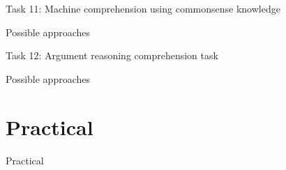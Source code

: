 \documentclass[10pt, compress]{beamer}
\begin{document}
\begin{frame}{Task 11: Machine comprehension using commonsense knowledge}


\end{frame}

\begin{frame}{Possible approaches}


\end{frame}

\begin{frame}{Task 12: Argument reasoning comprehension task}


\end{frame}

\begin{frame}{Possible approaches}


\end{frame}

\section{Practical}

\begin{frame}{Practical}


\end{frame}
\end{document}
